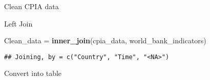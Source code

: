 \documentclass[]{article}
\newenvironment{Shaded}{\begin{snugshade}}{\end{snugshade}}
\newcommand{\DataTypeTok}[1]{\textcolor[rgb]{0.13,0.29,0.53}{#1}}
\newcommand{\KeywordTok}[1]{\textcolor[rgb]{0.13,0.29,0.53}{\textbf{#1}}}
\newcommand{\NormalTok}[1]{#1}
\newcommand{\OperatorTok}[1]{\textcolor[rgb]{0.81,0.36,0.00}{\textbf{#1}}}
\newcommand{\StringTok}[1]{\textcolor[rgb]{0.31,0.60,0.02}{#1}}
\begin{document}
Clean CPIA data

\begin{Shaded}
\end{Shaded}

Left Join

\begin{Shaded}
\begin{Highlighting}[]
\NormalTok{Clean_data =}\StringTok{ }\KeywordTok{inner_join}\NormalTok{(cpia_data, world_bank_indicators)}
\end{Highlighting}
\end{Shaded}

\begin{verbatim}
## Joining, by = c("Country", "Time", "<NA>")
\end{verbatim}

Convert into table
\end{document}
